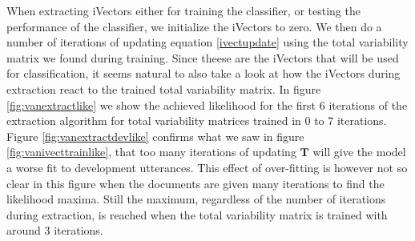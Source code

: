 When extracting iVectors either for training the classifier, or testing the performance of the classifier, we initialize the iVectors to zero. We then do a number of iterations of updating equation \ref{ivectupdate} using the total variability matrix we found during training. Since theese are the iVectors that will be used for classification, it seems natural to also take a look at how the iVectors during extraction react to the trained total variability matrix. In figure \ref{fig:vanextractlike} we show the achieved likelihood for the first 6 iterations of the extraction algorithm for total variability matrices trained in 0 to 7 iterations. Figure \ref{fig:vanextractdevlike} confirms what we saw in figure \ref{fig:vanivecttrainlike}, that too many iterations of updating $\mathbf{T}$ will give the model a worse fit to development utterances. This effect of over-fitting is however not so clear in this figure when the documents are given many iterations to find the likelihood maxima. Still the maximum, regardless of the number of iterations during extraction, is reached when the total variability matrix is trained with around 3 iterations.

